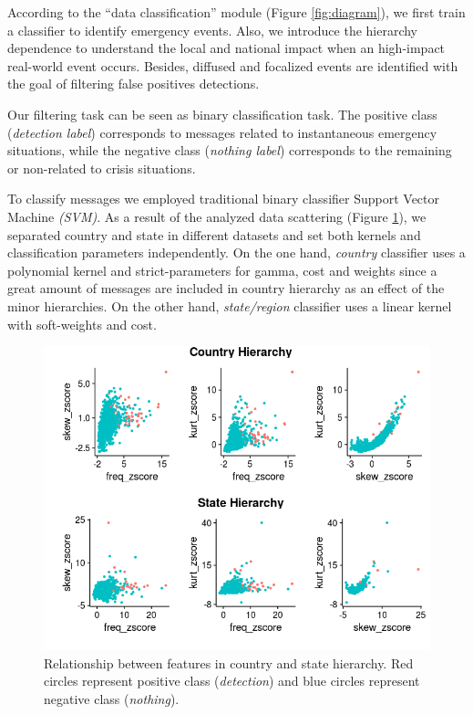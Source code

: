 \documentclass[sigconf]{acmart}
\begin{document}
According to the ``data classification'' module (Figure \ref{fig:diagram}), we first train a classifier to identify emergency events. Also, we introduce the hierarchy dependence to understand the local and national impact when an high-impact real-world event occurs. Besides, diffused and focalized events are identified with the goal of filtering false positives detections.

Our filtering task can be seen as binary classification task. The positive class (\textit{detection label}) corresponds to messages related to instantaneous emergency situations, while the negative class (\textit{nothing label}) corresponds to the remaining or non-related to crisis situations.

To classify messages we employed traditional binary classifier Support Vector Machine \textit{(SVM)}. As a result of the analyzed data scattering (Figure \ref{fig:scatter}), we separated country and state in different datasets and set both kernels and classification parameters independently. On the one hand, \textit{country} classifier uses a polynomial kernel and strict-parameters for gamma, cost and weights since a great amount of messages are included in country hierarchy as an effect of the minor hierarchies. On the other hand, \textit{state/region} classifier uses a linear kernel with soft-weights and cost.

\begin{figure}
	\centering
	\includegraphics[width=\columnwidth]{img/scatter.png}
	\caption{Relationship between features in country and state hierarchy. Red circles represent positive class (\textit{detection}) and blue circles represent negative class (\textit{nothing}).}
	\label{fig:scatter}
\end{figure}
\end{document}
